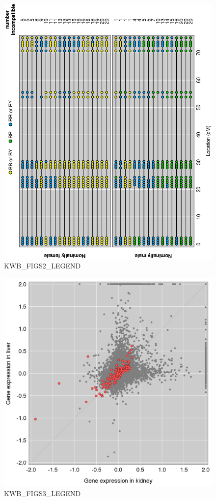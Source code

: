 \documentclass[letterpaper,twoside]{article}
\begin{document}
\clearpage






\begin{figure}[p]
\centerline{\includegraphics[angle=270,width=\textwidth]{SuppFigs/figS2.eps}}

\caption{KWB_FIGS2_LEGEND}
\end{figure}

\clearpage



\begin{figure}[p]
\centerline{\includegraphics[width=4.5in]{SuppFigs/figS3.jpg}}

\caption{KWB_FIGS3_LEGEND}
\end{figure}
\end{document}
